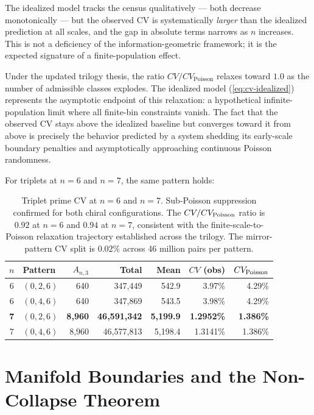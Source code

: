 \documentclass[11pt]{article}
\theoremstyle{remark}
\begin{document}
The idealized model tracks the census qualitatively — both decrease
monotonically — but the observed CV is systematically \emph{larger}
than the idealized prediction at all scales, and the gap in absolute
terms narrows as $n$ increases. This is not a deficiency of the
information-geometric framework; it is the expected signature of a
finite-population effect.

Under the updated trilogy thesis, the ratio $CV/CV_{\mathrm{Poisson}}$
relaxes toward $1.0$ as the number of admissible classes explodes.
The idealized model (\ref{eq:cv-idealized}) represents the asymptotic
endpoint of this relaxation: a hypothetical infinite-population limit
where all finite-bin constraints vanish. The fact that the observed
CV stays above the idealized baseline but converges toward it from
above is precisely the behavior predicted by a system shedding its
early-scale boundary penalties and asymptotically approaching
continuous Poisson randomness.

For triplets at $n=6$ and $n=7$, the same pattern holds:
\begin{table}[h]
\centering
\begin{tabular}{c l r r r r r}
\toprule
$n$ & Pattern & $A_{n,3}$ & Total & Mean & $CV$ (obs) & $CV_{\rm Poisson}$ \\
\midrule
6 & $(0,2,6)$ & 640 & 347{,}449 & 542.9 & 3.97\% & 4.29\% \\
6 & $(0,4,6)$ & 640 & 347{,}869 & 543.5 & 3.98\% & 4.29\% \\
\textbf{7} & \textbf{$(0,2,6)$} & \textbf{8{,}960} & \textbf{46{,}591{,}342} & \textbf{5{,}199.9} & \textbf{1.2952\%} & \textbf{1.386\%} \\
7 & $(0,4,6)$ & 8{,}960 & 46{,}577{,}813 & 5{,}198.4 & 1.3141\% & 1.386\% \\
\bottomrule
\end{tabular}
\caption{Triplet prime CV at $n=6$ and $n=7$. Sub-Poisson suppression
confirmed for both chiral configurations. The $CV/CV_{\rm Poisson}$ ratio
is $0.92$ at $n=6$ and $0.94$ at $n=7$, consistent with the
finite-scale-to-Poisson relaxation trajectory established across the
trilogy. The mirror-pattern CV split is $0.02\%$ across 46 million
pairs per pattern.}
\end{table}

\section{Manifold Boundaries and the Non-Collapse Theorem}
\label{sec:non-collapse}
\end{document}
